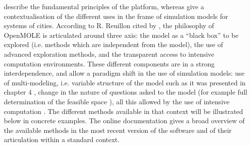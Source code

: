 \documentclass[10pt]{article}
\begin{document}
\cite{reuillon2013openmole} describe the fundamental principles of the platform, whereas \cite{} give a contextualisation of the different uses in the frame of simulation models for systems of cities. According to R. Reuillon cited by \cite{}, the philosophy of OpenMOLE is articulated around three axis: the model as a ``black box'' to be explored (i.e. methods which are independent from the model), the use of advanced exploration methods, and the transparent access to intensive computation environments. These different components are in a strong interdependence, and allow a paradigm shift in the use of simulation models: use of multi-modeling, i.e. variable structure of the model such as it was presented in chapter 4 \citep{}, change in the nature of questions asked to the model (for example full determination of the feasible space \citep{}), all this allowed by the use of intensive computation \citep{}. The different methods available in that context will be illustrated below in concrete examples. The online documentation gives a broad overview of the available methods in the most recent version of the software and of their articulation within a standard context.
\end{document}
